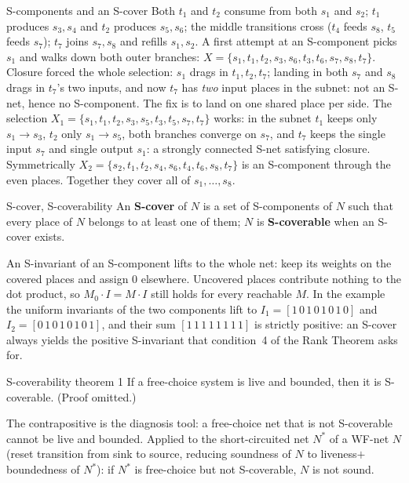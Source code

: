 \begin{examplebox}{S-components and an S-cover}
Both $t_1$ and $t_2$ consume from both $s_1$ and $s_2$; $t_1$ produces $s_3, s_4$ and $t_2$ produces $s_5, s_6$; the middle transitions cross ($t_4$ feeds $s_8$, $t_5$ feeds $s_7$); $t_7$ joins $s_7, s_8$ and refills $s_1, s_2$. A first attempt at an S-component picks $s_1$ and walks down both outer branches: $X = \{s_1, t_1, t_2, s_3, s_6, t_3, t_6, s_7, s_8, t_7\}$. Closure forced the whole selection: $s_1$ drags in $t_1, t_2, t_7$; landing in both $s_7$ and $s_8$ drags in $t_7$'s two inputs, and now $t_7$ has \emph{two} input places in the subnet: not an S-net, hence no S-component. The fix is to land on one shared place per side. The selection $X_1 = \{s_1, t_1, t_2, s_3, s_5, t_3, t_5, s_7, t_7\}$ works: in the subnet $t_1$ keeps only $s_1 \to s_3$, $t_2$ only $s_1 \to s_5$, both branches converge on $s_7$, and $t_7$ keeps the single input $s_7$ and single output $s_1$: a strongly connected S-net satisfying closure. Symmetrically $X_2 = \{s_2, t_1, t_2, s_4, s_6, t_4, t_6, s_8, t_7\}$ is an S-component through the even places. Together they cover all of $s_1, \ldots, s_8$.
\end{examplebox}
\begin{definitionbox}{S-cover, S-coverability}
An \textbf{S-cover} of $N$ is a set of S-components of $N$ such that every place of $N$ belongs to at least one of them; $N$ is \textbf{S-coverable} when an S-cover exists.
\end{definitionbox}
An S-invariant of an S-component lifts to the whole net: keep its weights on the covered places and assign $0$ elsewhere. Uncovered places contribute nothing to the dot product, so $M_0 \cdot I = M \cdot I$ still holds for every reachable $M$. In the example the uniform invariants of the two components lift to $I_1 = [1\,0\,1\,0\,1\,0\,1\,0]$ and $I_2 = [0\,1\,0\,1\,0\,1\,0\,1]$, and their sum $[1\,1\,1\,1\,1\,1\,1\,1]$ is strictly positive: an S-cover always yields the positive S-invariant that condition~4 of the Rank Theorem asks for.

\begin{definitionbox}{S-coverability theorem 1}
If a free-choice system is live and bounded, then it is S-coverable. (Proof omitted.)
\end{definitionbox}
The contrapositive is the diagnosis tool: a free-choice net that is not S-coverable cannot be live and bounded. Applied to the short-circuited net $N^{*}$ of a WF-net $N$ (reset transition from sink to source, reducing soundness of $N$ to liveness$+$boundedness of $N^{*}$): if $N^{*}$ is free-choice but not S-coverable, $N$ is not sound.

